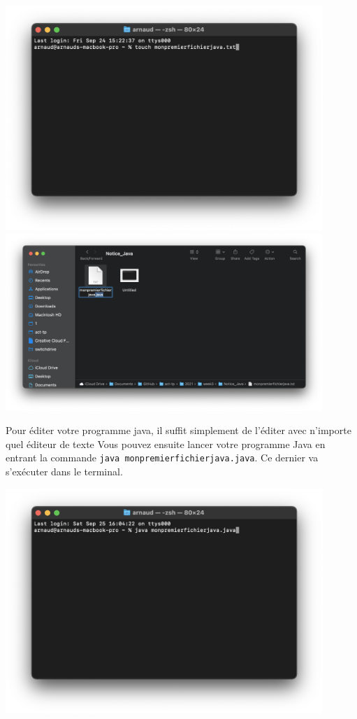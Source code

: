 \begin{center}
	\includegraphics[width=12cm]{terminal.png}
	\includegraphics[width=12cm]{ext}
	
\end{center}

Pour éditer votre programme java, il suffit simplement de l'éditer avec n'importe quel éditeur de texte
Vous pouvez ensuite lancer votre programme Java en entrant la commande \lstinline{java monpremierfichierjava.java}. Ce dernier va s'exécuter dans le terminal.
\begin{center}
	\includegraphics[width=12cm]{exe}	
\end{center}
 

